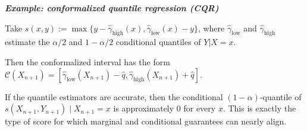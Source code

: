 \emph{\textbf{Example: conformalized quantile regression (CQR)}}


Take $s(x,y) := \max\{y - \hat{\gamma}_{\text{high}}(x), \hat{\gamma}_{\text{low}}(x) - y\}$, where $\hat{\gamma}_{\text{low}}$ and $\hat{\gamma}_{\text{high}}$ estimate the $\alpha/2$ and $1-\alpha/2$ conditional quantiles of $Y|X=x$.

Then the conformalized interval has the form $\mathcal{C}(X_{n+1}) = [\hat{\gamma}_{\text{low}}(X_{n+1}) - \hat{q}, \hat{\gamma}_{\text{high}}(X_{n+1}) + \hat{q}]$.

If the quantile estimators are accurate, then the conditional $(1-\alpha)$-quantile of $s(X_{n+1}, Y_{n+1}) \mid X_{n+1} = x$ is approximately 0 for every $x$. This is exactly the type of score for which marginal and conditional guarantees can nearly align.